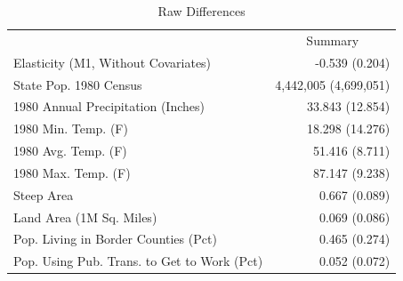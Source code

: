 \begin{table}[!h]
\caption{Raw Differences}
\centering
\begin{tabular}{ll}
\cline{1-2}
\multicolumn{1}{r}{} &
  \multicolumn{1}{c}{Summary} \\
\cline{1-2}
\multicolumn{1}{l}{Elasticity (M1, Without Covariates)} &
  \multicolumn{1}{r}{-0.539 (0.204)} \\
\multicolumn{1}{l}{State Pop. 1980 Census} &
  \multicolumn{1}{r}{4,442,005 (4,699,051)} \\
\multicolumn{1}{l}{1980 Annual Precipitation (Inches)} &
  \multicolumn{1}{r}{33.843 (12.854)} \\
\multicolumn{1}{l}{1980 Min. Temp. (F)} &
  \multicolumn{1}{r}{18.298 (14.276)} \\
\multicolumn{1}{l}{1980 Avg. Temp. (F)} &
  \multicolumn{1}{r}{51.416 (8.711)} \\
\multicolumn{1}{l}{1980 Max. Temp. (F)} &
  \multicolumn{1}{r}{87.147 (9.238)} \\
\multicolumn{1}{l}{Steep Area} &
  \multicolumn{1}{r}{0.667 (0.089)} \\
\multicolumn{1}{l}{Land Area (1M Sq. Miles)} &
  \multicolumn{1}{r}{0.069 (0.086)} \\
\multicolumn{1}{l}{Pop. Living in Border Counties (Pct)} &
  \multicolumn{1}{r}{0.465 (0.274)} \\
\multicolumn{1}{l}{Pop. Using Pub. Trans. to Get to Work (Pct)} &
  \multicolumn{1}{r}{0.052 (0.072)} \\
\cline{1-2}
\end{tabular}
\end{table}

